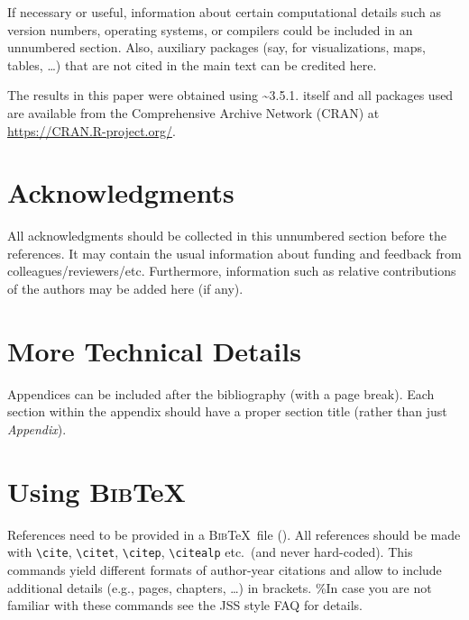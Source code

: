 \documentclass[
]{jdssv}
\begin{document}
If necessary or useful, information about certain computational details
such as version numbers, operating systems, or compilers could be
included in an unnumbered section. Also, auxiliary packages (say, for
visualizations, maps, tables, \dots) that are not cited in the main text
can be credited here.

The results in this paper were obtained using
\textasciitilde3.5.1.  itself and all packages
used are available from the Comprehensive  Archive Network
(CRAN) at \url{https://CRAN.R-project.org/}.

\hypertarget{acknowledgments}{%
\section*{Acknowledgments}\label{acknowledgments}}

All acknowledgments should be collected in this unnumbered section
before the references. It may contain the usual information about
funding and feedback from colleagues/reviewers/etc. Furthermore,
information such as relative contributions of the authors may be added
here (if any).



\newpage

\setcounter{section}{0}
\renewcommand{\thesection}{\Alph{section}}

\hypertarget{app:technical}{%
\section{More Technical Details}\label{app:technical}}

Appendices can be included after the bibliography (with a page break).
Each section within the appendix should have a proper section title
(rather than just \emph{Appendix}).

\section[Using BibTeX]{Using \textsc{Bib}{\TeX}} \label{app:bibtex}

References need to be provided in a \textsc{Bib}\TeX~file ().
All references should be made with \verb|\cite|, \verb|\citet|,
\verb|\citep|, \verb|\citealp| etc.~(and never hard-coded). This
commands yield different formats of author-year citations and allow to
include additional details (e.g., pages, chapters, \dots) in brackets.
\%In case you are not familiar with these commands see the JSS style FAQ
for details.
\end{document}

